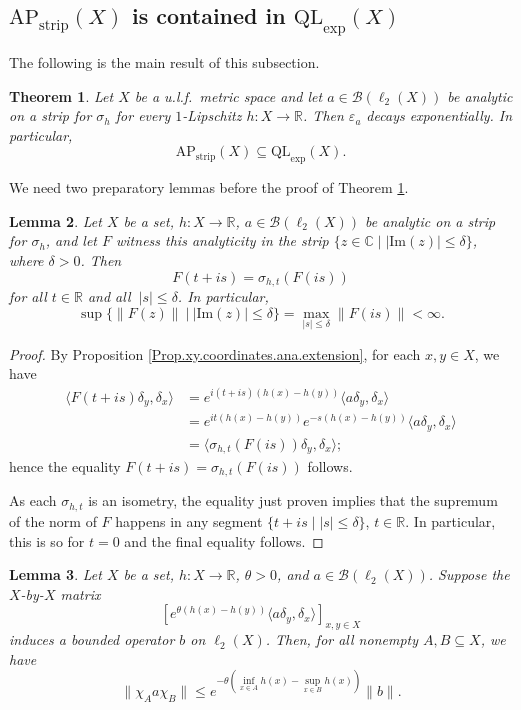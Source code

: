 \documentclass[11pt]{amsart}
\newcommand{\R}{\mathbb{R}}
\newcommand{\C}{\mathbb{C}}
\newcommand{\cB}{\mathcal{B}}
\newcommand{\eps}{\varepsilon}
\numberwithin{equation}{section}
\newtheorem{theorem}{Theorem}[section]
\newtheorem{lemma}[theorem]{Lemma}
\theoremstyle{definition}
\theoremstyle{remark}
\begin{document}
 \subsection{$\mathrm{AP}_{\mathrm{strip}}(X)$ is contained in  $\mathrm{QL}_{\exp}(X)$}
The following is the main result of this subsection.

\begin{theorem}\label{Thm.Band.In.Led}
Let $X$ be a u.l.f.\ metric space and let $a\in\cB(\ell_2(X))$ be analytic on a strip for $\sigma_h$ for every $1$-Lipschitz $h\colon X\to\R$. Then $\eps_a$ decays exponentially. In particular,
\[\mathrm{AP}_{\mathrm{strip}}(X)\subseteq \mathrm{QL}_{\exp}(X).\]
\end{theorem}



 We need two preparatory lemmas before the proof of Theorem \ref{Thm.Band.In.Led}.

\begin{lemma}\label{Lemma.BandStructure}
Let $X$ be a set, $h\colon X\to\R$,    $a\in\cB(\ell_2(X))$ be analytic on a strip for $\sigma_h$, and let   $F$ witness this analyticity in the strip  $\{z\in \C\mid |\mathrm{Im}(z)|\leq \delta\}$, where   $\delta>0$.
 Then
 \[F(t+is)=\sigma_{h,t}(F(is))\] for all  $t\in\R$  and all  $\ |s|\leq\delta$. In particular,
    \[\sup\big\{\|F(z)\|\ \big|\ |\mathrm{Im}(z)|\leq\delta\big\}=\max_{|s|\leq\delta}\|F(is)\|<\infty.\]
\end{lemma}

\begin{proof}
By Proposition \ref{Prop.xy.coordinates.ana.extension}, for each $x,y\in X$, we have
\begin{align*}
\langle     F(t+is)\delta_y,\delta_x\rangle &=e^{i(t+is)(h(x)-h(y))}\langle a\delta_y,\delta_x\rangle\\
    &=e^{it (h(x)-h(y))}e^{-s(h(x)-h(y))}\langle a\delta_y,\delta_x\rangle\\
    &=\langle \sigma_{h,t}(F(is))\delta_y,\delta_x\rangle;
\end{align*}
hence the equality $F(t+is)=\sigma_{h,t}(F(is)) $ follows.

As  each $\sigma_{h,t}$ is an isometry, the equality just proven implies that the supremum  of the norm of $F$ happens in any segment $\{t+is\mid |s|\leq \delta\}$, $t\in \R$. In particular, this is so for $t=0$ and the final equality   follows.
\end{proof}


\begin{lemma}\label{Lemma.GapEstimate}
Let $X$ be a set, $h\colon X\to\R$, $\theta>0$, and $a\in\cB(\ell_2(X))$. Suppose the $X$-by-$X$ matrix \[\left[e^{\theta(h(x)-h(y))}\langle a\delta_y,\delta_x\rangle\right]_{x,y\in X}\] induces a bounded operator $b$ on $\ell_2(X)$. Then, for all nonempty $A,B\subseteq X$, we have
\[\|\chi_Aa\chi_B\|\leq e^{-\theta\left( \inf_{x\in A}h(x)- \sup_{x\in B}h(x)\right)}\|b\|.\]
\end{lemma}
\end{document}
